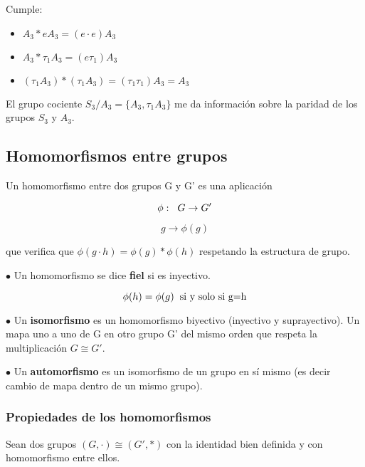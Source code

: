 Cumple:

\begin{itemize}
\item $A_3*eA_3=(e\cdot e)A_3$
\item $A_3*\tau _1A_3=(e\tau _1)A_3$

\item $(\tau _1A_3)*(\tau _1 A_3)=(\tau _1 \tau _1)A_3=A_3$

\end{itemize}

\smallskip
El grupo cociente $S_3/A_3= \lbrace A_3, \tau _1 A_3\rbrace $ me da información sobre la paridad de los grupos $S_3$ y $A_3$.

\subsection{Homomorfismos entre grupos}
Un homomorfismo entre dos grupos G y G' es una aplicación

$$\phi : \hspace{0.2cm} G \rightarrow G'$$

$$g\rightarrow \phi(g)$$

que verifica que $\phi (g\cdot h)=\phi (g)*\phi (h)$ respetando la estructura de grupo.

\smallskip
$\bullet$ Un homomorfismo se dice \textbf{fiel} si es inyectivo.

$$\phi (h)=\phi (g) \hspace{0.2cm} \text{si y solo si g=h}$$

\smallskip
$\bullet$ Un \textbf{isomorfismo} es un homomorfismo biyectivo (inyectivo y suprayectivo). Un mapa uno a uno de G en otro grupo G' del mismo orden que respeta la multiplicación $G\cong G'$.

\smallskip
$\bullet$ Un \textbf{automorfismo} es un isomorfismo de un grupo en sí mismo (es decir cambio de mapa dentro de un mismo grupo).

\subsubsection{Propiedades de los homomorfismos}

Sean dos grupos $(G,\cdot)\cong (G',*)$ con la identidad bien definida y con homomorfismo entre ellos.

